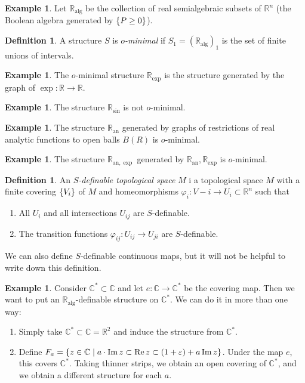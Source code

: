 \documentclass[leqno, openany]{memoir}
\theoremstyle{definition}
\newtheorem{defn}[thm]{Definition}
\newtheorem{exm}[thm]{Example}
\theoremstyle{remark}
\theoremstyle{plain}
\theoremstyle{definition}
\theoremstyle{remark}
\newcommand{\R}{\mathbb{R}}
\newcommand{\C}{\mathbb{C}}
\newcommand{\ep}{\varepsilon}
\newcommand{\mr}[1]{\mathrm{#1}}
\begin{document}
\begin{exm}
    Let $\R_{\mr{alg}}$ be the collection of real semialgebraic subsets of $\R^n$ (the Boolean algebra generated by $\qty{P \geq 0}$).
\end{exm}

\begin{defn}
    A structure $S$ is \textit{$o$-minimal} if $S_1 = (\R_{\mr{alg}})_1$ is the set of finite unions of intervals.
\end{defn}

\begin{exm}
    The $o$-minimal structure $\R_{\mr{exp}}$ is the structure generated by the graph of $\exp \colon \R \to \R$.
\end{exm}

\begin{exm}
    The structure $\R_{\sin}$ is not $o$-minimal.
\end{exm}

\begin{exm}
    The structure $\R_{\mr{an}}$ generated by graphs of restrictions of real analytic functions to open balls $B(R)$ is $o$-minimal.
\end{exm}

\begin{exm}
    The structure $\R_{\mr{an}, \exp}$ generated by $\R_{\mr{an}}, \R_{\exp}$ is $o$-minimal.
\end{exm}

\begin{defn}
    An \textit{$S$-definable topological space} $M$ i a topological space $M$ with a finite covering $\qty{V_i}$ of $M$ and homeomorphisms $\varphi_i \colon V-i \to U_i \subset \R^n$ such that
    \begin{enumerate}
        \item All $U_i$ and all intersections $U_{ij}$ are $S$-definable.
        \item The transition functions $\varphi_{ij} \colon U_{ij} \to U_{ji}$ are $S$-definable.
    \end{enumerate}
\end{defn}

We can also define $S$-definable continuous maps, but it will not be helpful to write down this definition.

\begin{exm}
    Consider $\C^* \subset \C$ and let $e \colon \C \to \C^*$ be the covering map. Then we want to put an $\R_{\mr{alg}}$-definable structure on $\C^*$. We can do it in more than one way:
    \begin{enumerate}
        \item Simply take $\C^* \subset \C = \R^2$ and induce the structure from $\C^*$.
        \item Define $F_a = \qty{z \in \C \mid a \cdot \Im z \subset \Re z \subset (1+\ep) + a \Im z}$. Under the map $e$, this covers $\C^*$. Taking thinner strips, we obtain an open covering of $\C^*$, and we obtain a different structure for each $a$.
    \end{enumerate}
\end{exm}
\end{document}
